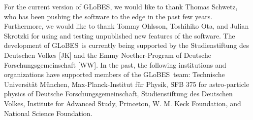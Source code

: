 \documentclass[12pt,a4paper]{article}
\newcommand{\GLOBES}{{\sf GLoBES}}
\begin{document}
For the current version of \GLOBES , we would like to 
thank Thomas Schwetz, who has been pushing the software to the edge in the 
past few years. Furthermore, we would like to thank Tommy Ohlsson,
Toshihiko Ota, and Julian Skrotzki for using and testing unpublished new features of the software.
%
The development of \GLOBES\ is currently being supported by the Studienstiftung des Deutschen Volkes [JK] and the
 Emmy Noether-Program of Deutsche Forschungsgemeinschaft [WW].
%
In the past, the following institutions and organizations have supported 
members of the \GLOBES\ team: Technische Universit\"at M\"unchen,
Max-Planck-Institut f\"ur Physik, SFB 375 for astro-particle physics
of Deutsche Forschungsgemeinschaft, Studienstiftung des Deutschen Volkes,
Institute for Advanced Study, Princeton, W. M. Keck Foundation, and National Science Foundation.



\end{document}
